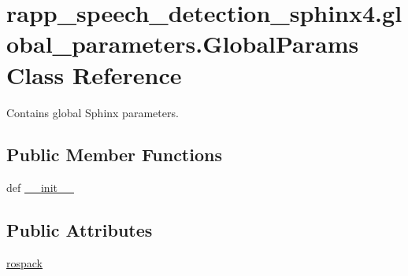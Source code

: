 \hypertarget{classrapp__speech__detection__sphinx4_1_1global__parameters_1_1GlobalParams}{\section{rapp\-\_\-speech\-\_\-detection\-\_\-sphinx4.\-global\-\_\-parameters.\-Global\-Params Class Reference}
\label{classrapp__speech__detection__sphinx4_1_1global__parameters_1_1GlobalParams}
}


Contains global Sphinx parameters.  


\subsection*{Public Member Functions}
\begin{DoxyCompactItemize}
\item 
def \hyperlink{classrapp__speech__detection__sphinx4_1_1global__parameters_1_1GlobalParams_a00ffd74720678058d8380021d4a167d9}{\-\_\-\-\_\-init\-\_\-\-\_\-}
\end{DoxyCompactItemize}
\subsection*{Public Attributes}
\begin{DoxyCompactItemize}
\item 
\hyperlink{classrapp__speech__detection__sphinx4_1_1global__parameters_1_1GlobalParams_a544bff3ab91e6ec8c782ba2b4386ef0a}{rospack}
\end{DoxyCompactItemize}
